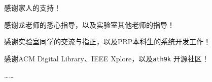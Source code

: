 
\begin{thanks}

  感谢家人的支持！

  感谢龙老师的悉心指导，以及实验室其他老师的指导！

  感谢实验室同学的交流与指正，以及PRP本科生的系统开发工作！

  感谢ACM Digital Library、IEEE Xplore，以及\texttt{ath9k} 开源社区！

  ……

\end{thanks}
